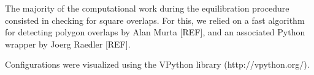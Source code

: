 The majority of the computational work during the equilibration procedure consisted in checking for square overlaps.  For this, we relied on a fast algorithm for detecting polygon overlaps by Alan Murta [REF], and an associated Python wrapper by Joerg Raedler [REF].

Configurations were visualized using the VPython library (http://vpython.org/).








